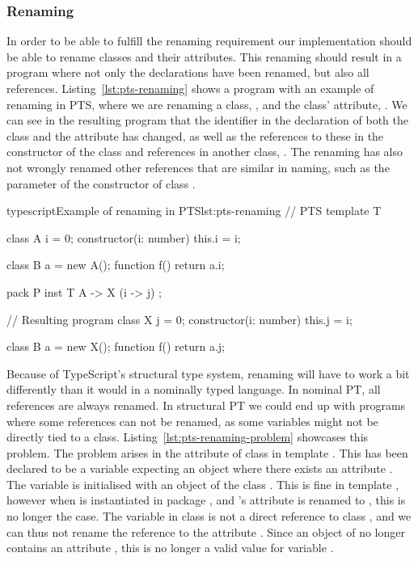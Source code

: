 \subsubsection{Renaming}\label{subsubsec:pts-renaming}

In order to be able to fulfill the renaming requirement our implementation should be able to rename classes and their attributes.
This renaming should result in a program where not only the declarations have been renamed, but also all references.
Listing~\vref{lst:pts-renaming} shows a program with an example of renaming in PTS, where we are renaming a class, , and the class' attribute, .
We can see in the resulting program that the identifier in the declaration of both the class and the attribute has changed, as well as the references to these in the constructor of the class and references in another class, \@.
The renaming has also not wrongly renamed other references that are similar in naming, such as the parameter of the constructor of class \@.

\begin{code}{typescript}{Example of renaming in PTS}{lst:pts-renaming}
    // PTS
    template T {
        class A {
            i = 0;
            constructor(i: number) {
                this.i = i;
            }
        }

        class B {
            a = new A();
            function f() {
                return a.i;
            }
        }
    }

    pack P {
        inst T { A -> X (i -> j) };
    }

    // Resulting program
    class X {
        j = 0;
        constructor(i: number) {
            this.j = i;
        }
    }

    class B {
        a = new X();
        function f() {
            return a.j;
        }
    }
\end{code}

Because of TypeScript's structural type system, renaming will have to work a bit differently than it would in a nominally typed language.
In nominal PT, all references are always renamed.
In structural PT we could end up with programs where some references can not be renamed, as some variables might not be directly tied to a class.
Listing~\vref{lst:pts-renaming-problem} showcases this problem.
The problem arises in the  attribute of class  in template .
This has been declared to be a variable expecting an object where there exists an attribute .
The variable  is initialised with an object of the class .
This is fine in template , however when  is instantiated in package , and 's attribute  is renamed to , this is no longer the case.
The  variable in class  is not a direct reference to class , and we can thus not rename the reference to the attribute .
Since an object of  no longer contains an attribute , this is no longer a valid value for variable .



